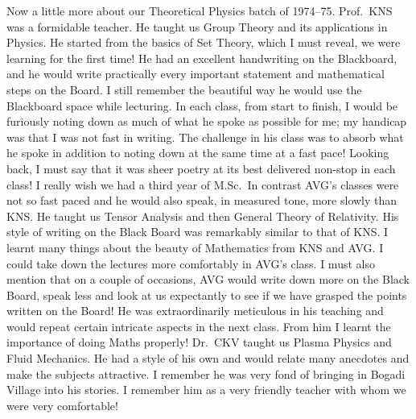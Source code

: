 Now a little more about our Theoretical Physics batch of 1974--75. Prof.\ KNS was a formidable teacher. He taught us Group Theory and its applications in Physics. He started from the basics of Set Theory, which I must reveal, we were learning for the first time! He had an excellent handwriting on the Blackboard, and he would write practically every important statement and mathematical steps on the Board. I still remember the beautiful way he would use the Blackboard space while lecturing. In each class, from start to finish, I would be furiously noting down as much of what he spoke as possible for me; my handicap was that I was not fast in writing. The challenge in his class was to absorb what he spoke in addition to noting down at the same time at a fast pace! Looking back, I must say that it was sheer poetry at its best delivered non-stop in each class! I really wish we had a third year of M.Sc.\ In contrast AVG's classes were not so fast paced and he would also speak, in measured tone, more slowly than KNS. He taught us Tensor Analysis and then General Theory of Relativity. His style of writing on the Black Board was remarkably similar to that of KNS. I learnt many things about the beauty of Mathematics from KNS and AVG. I could take down the lectures more comfortably in AVG's class. I must also mention that on a couple of occasions, AVG would write down more on the Black Board, speak less and look at us expectantly to see if we have grasped the points written on the Board! He was extraordinarily meticulous in his teaching and would repeat certain intricate aspects in the next class. From him I learnt the importance of doing Maths properly! Dr.\ CKV taught us Plasma Physics and Fluid Mechanics. He had a style of his own and would relate many anecdotes and make the subjects attractive. I remember he was very fond of bringing in Bogadi Village into his stories. I remember him as a very friendly teacher with whom we were very comfortable!

